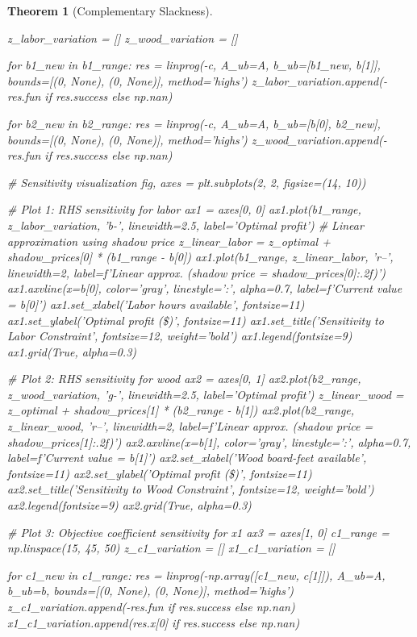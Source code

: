 \documentclass[a4paper, 11pt]{article}
\newtheorem{theorem}{Theorem}[section]
\begin{document}
\begin{theorem}[Complementary Slackness]
\begin{pycode}
z_labor_variation = []
z_wood_variation = []

for b1_new in b1_range:
    res = linprog(-c, A_ub=A, b_ub=[b1_new, b[1]],
                 bounds=[(0, None), (0, None)], method='highs')
    z_labor_variation.append(-res.fun if res.success else np.nan)

for b2_new in b2_range:
    res = linprog(-c, A_ub=A, b_ub=[b[0], b2_new],
                 bounds=[(0, None), (0, None)], method='highs')
    z_wood_variation.append(-res.fun if res.success else np.nan)

# Sensitivity visualization
fig, axes = plt.subplots(2, 2, figsize=(14, 10))

# Plot 1: RHS sensitivity for labor
ax1 = axes[0, 0]
ax1.plot(b1_range, z_labor_variation, 'b-', linewidth=2.5,
         label='Optimal profit')
# Linear approximation using shadow price
z_linear_labor = z_optimal + shadow_prices[0] * (b1_range - b[0])
ax1.plot(b1_range, z_linear_labor, 'r--', linewidth=2,
         label=f'Linear approx. (shadow price = {shadow_prices[0]:.2f})')
ax1.axvline(x=b[0], color='gray', linestyle=':', alpha=0.7,
           label=f'Current value = {b[0]}')
ax1.set_xlabel('Labor hours available', fontsize=11)
ax1.set_ylabel('Optimal profit (\$)', fontsize=11)
ax1.set_title('Sensitivity to Labor Constraint', fontsize=12, weight='bold')
ax1.legend(fontsize=9)
ax1.grid(True, alpha=0.3)

# Plot 2: RHS sensitivity for wood
ax2 = axes[0, 1]
ax2.plot(b2_range, z_wood_variation, 'g-', linewidth=2.5,
         label='Optimal profit')
z_linear_wood = z_optimal + shadow_prices[1] * (b2_range - b[1])
ax2.plot(b2_range, z_linear_wood, 'r--', linewidth=2,
         label=f'Linear approx. (shadow price = {shadow_prices[1]:.2f})')
ax2.axvline(x=b[1], color='gray', linestyle=':', alpha=0.7,
           label=f'Current value = {b[1]}')
ax2.set_xlabel('Wood board-feet available', fontsize=11)
ax2.set_ylabel('Optimal profit (\$)', fontsize=11)
ax2.set_title('Sensitivity to Wood Constraint', fontsize=12, weight='bold')
ax2.legend(fontsize=9)
ax2.grid(True, alpha=0.3)

# Plot 3: Objective coefficient sensitivity for x1
ax3 = axes[1, 0]
c1_range = np.linspace(15, 45, 50)
z_c1_variation = []
x1_c1_variation = []

for c1_new in c1_range:
    res = linprog(-np.array([c1_new, c[1]]), A_ub=A, b_ub=b,
                 bounds=[(0, None), (0, None)], method='highs')
    z_c1_variation.append(-res.fun if res.success else np.nan)
    x1_c1_variation.append(res.x[0] if res.success else np.nan)


\end{pycode}
\end{theorem}
\end{document}
